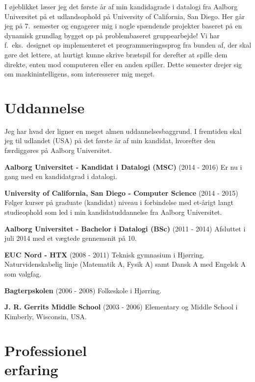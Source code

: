 \documentclass[margin,line,a4paper]{resume}
\begin{document}
\begin{resume}
    I øjeblikket læser jeg det første år af min kandidagrade i datalogi
    fra Aalborg Universitet på et udlandsophold på University of
    California, San Diego. Her går jeg på 7.\ semester og engagerer mig
    i nogle spændende projekter baseret på en dynamisk grundlag bygget
    op på problembaseret gruppearbejde! Vi har f.\ eks.\ designet op
    implementeret et programmeringssprog fra bunden af, der skal gøre
    det lettere, at hurtigt kunne skrive brætspil for derefter at spille
    dem direkte, enten mod computeren eller en anden spiller. Dette
    semester drejer sig om maskinintelligens, som interesserer mig
    meget.

    \section{\mysidestyle Uddannelse}
    Jeg har hvad der ligner en meget almen uddannelsesbaggrund. I
    fremtiden skal jeg til udlandet (USA) på det første år af min
    kandidat, hvorefter den færdiggøres på Aalborg Universitet.

    \textbf{Aalborg Universitet - Kandidat i Datalogi (MSC)} (2014 -
    2016) Er nu i gang med en kandidatgrad i datalogi.

    \textbf{University of California, San Diego - Computer Science}
    (2014 - 2015) Følger kurser på graduate (kandidat) niveau
    i forbindelse med et-årigt langt studieophold som led i min
    kandidatuddannelse fra Aalborg Universitet.

    \textbf{Aalborg Universitet - Bachelor i Datalogi (BSc)}
      (2011 - 2014) Afsluttet i juli 2014 med et vægtede gennemsnit på
      10.

    \textbf{EUC Nord - HTX} (2008 - 2011) Teknisk gymnasium i Hjørring.
      Naturvidenskabelig linje (Matematik A, Fysik A) samt Dansk A med
      Engelsk A som valgfag.

    \textbf{Bagterpskolen} (2006 - 2008) Folkeskole i Hjørring.

    \textbf{J. R. Gerrits Middle School} (2003 - 2006) Elementary og
      Middle School i Kimberly, Wisconsin, USA.

\section{\mysidestyle Professionel\\erfaring}\vspace{1mm}
\begin{description}


\end{description}
\end{resume}
\end{document}
